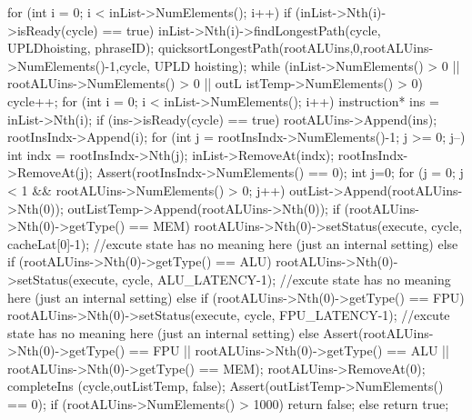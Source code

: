 \begin{DoxyCode}
                                                                                 
                                                                 {
        for (int i = 0; i < inList->NumElements(); i++) {
                if (inList->Nth(i)->isReady(cycle) == true) {
                        inList->Nth(i)->findLongestPath(cycle, UPLDhoisting, 
      phraseID);
                }
        }
        quicksortLongestPath(rootALUins,0,rootALUins->NumElements()-1,cycle, UPLD
      hoisting);
        while (inList->NumElements() > 0 || rootALUins->NumElements() > 0 || outL
      istTemp->NumElements() > 0) {
                cycle++;
                for (int i = 0; i < inList->NumElements(); i++) {
                        instruction* ins = inList->Nth(i);
                        if (ins->isReady(cycle) == true) {
                                rootALUins->Append(ins);
                                rootInsIndx->Append(i);
                        }
                }
                for (int j = rootInsIndx->NumElements()-1; j >= 0; j--) {
                        int indx = rootInsIndx->Nth(j);
                        inList->RemoveAt(indx);
                        rootInsIndx->RemoveAt(j);
                }
                Assert(rootInsIndx->NumElements() == 0);
                int j=0;
                for (j = 0; j < 1 && rootALUins->NumElements() > 0; j++) {
                        outList->Append(rootALUins->Nth(0));
                        outListTemp->Append(rootALUins->Nth(0));
                        if (rootALUins->Nth(0)->getType() == MEM) {
                                rootALUins->Nth(0)->setStatus(execute, cycle, 
      cacheLat[0]-1); //excute state has no meaning here (just an internal setting)
                        } else if (rootALUins->Nth(0)->getType() == ALU) {
                                rootALUins->Nth(0)->setStatus(execute, cycle, 
      ALU_LATENCY-1); //excute state has no meaning here (just an internal setting)
                        } else if (rootALUins->Nth(0)->getType() == FPU) {
                                rootALUins->Nth(0)->setStatus(execute, cycle, 
      FPU_LATENCY-1); //excute state has no meaning here (just an internal setting)
                        } else {
                                Assert(rootALUins->Nth(0)->getType() == FPU || 
                                       rootALUins->Nth(0)->getType() == ALU || 
                                       rootALUins->Nth(0)->getType() == MEM);
                        }
                        rootALUins->RemoveAt(0);
                }
                completeIns (cycle,outListTemp, false);
                Assert(outListTemp->NumElements() == 0);
        }
        if (rootALUins->NumElements() > 1000)
                return false;
        else
                return true;
}
\end{DoxyCode}
